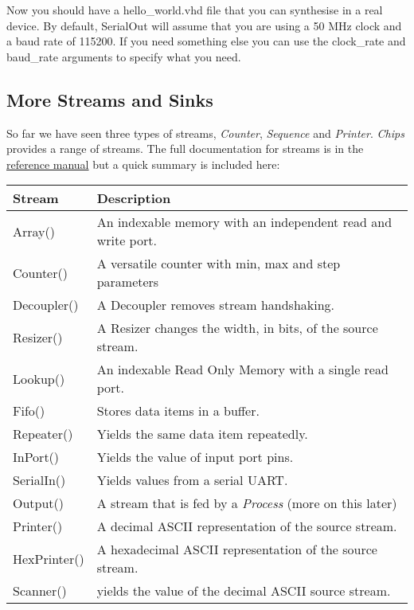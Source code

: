 \documentclass[letterpaper,10pt,english]{manual}
\begin{document}
Now you should have a hello\_world.vhd file that you can synthesise in a real
device. By default, SerialOut will assume that you are using a 50 MHz clock
and a baud rate of 115200. If you need something else you can use the
clock\_rate and baud\_rate arguments to specify what you need.


\subsection{More Streams and Sinks}

So far we have seen three types of streams, \emph{Counter}, \emph{Sequence} and
\emph{Printer}. \emph{Chips} provides a range of streams. The full documentation for
streams is in the \href{http://dawsonjon.github.com/chips/language\_reference/}{reference manual} but a quick summary is included here:

\begin{tabulary}{\textwidth}{|L|L|}
\hline
\textbf{
Stream
} & \textbf{
Description
}\\
\hline

Array()
 & 
An indexable memory with an independent read and write
port.
\\

Counter()
 & 
A versatile counter with min, max and step parameters
\\

Decoupler()
 & 
A Decoupler removes stream handshaking.
\\

Resizer()
 & 
A Resizer changes the width, in bits, of the source
stream.
\\

Lookup()
 & 
An indexable Read Only Memory with a single read port.
\\

Fifo()
 & 
Stores data items in a buffer.
\\

Repeater()
 & 
Yields the same data item repeatedly.
\\

InPort()
 & 
Yields the value of input port pins.
\\

SerialIn()
 & 
Yields values from a serial UART.
\\

Output()
 & 
A stream that is fed by a \emph{Process} (more on this later)
\\

Printer()
 & 
A decimal ASCII representation of the source stream.
\\

HexPrinter()
 & 
A hexadecimal ASCII representation of the source stream.
\\

Scanner()
 & 
yields the value of the decimal ASCII source stream.
\\
\hline
\end{tabulary}
\end{document}
